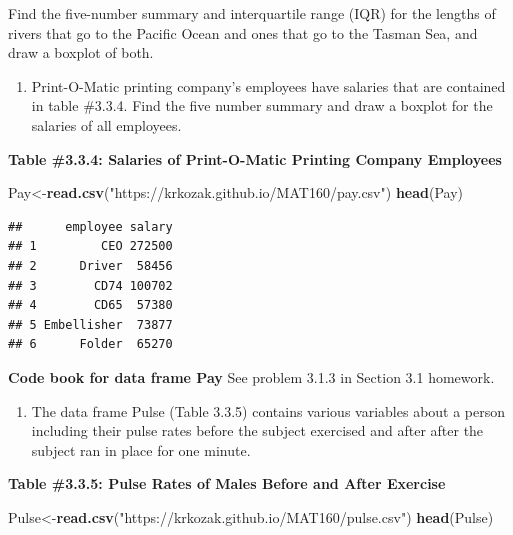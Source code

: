 \documentclass[]{book}
\newenvironment{Shaded}{\begin{snugshade}}{\end{snugshade}}
\newcommand{\KeywordTok}[1]{\textcolor[rgb]{0.13,0.29,0.53}{\textbf{#1}}}
\newcommand{\NormalTok}[1]{#1}
\newcommand{\StringTok}[1]{\textcolor[rgb]{0.31,0.60,0.02}{#1}}
\providecommand{\tightlist}{%
  \setlength{\itemsep}{0pt}\setlength{\parskip}{0pt}}
\begin{document}
Find the five-number summary and interquartile range (IQR) for the lengths of rivers that go to the Pacific Ocean and ones that go to the Tasman Sea, and draw a boxplot of both.

\begin{enumerate}
\def\labelenumi{\arabic{enumi}.}
\setcounter{enumi}{6}
\tightlist
\item
  Print-O-Matic printing company's employees have salaries that are contained in table \#3.3.4. Find the five number summary and draw a boxplot for the salaries of all employees.
\end{enumerate}

\textbf{Table \#3.3.4: Salaries of Print-O-Matic Printing Company Employees}

\begin{Shaded}
\begin{Highlighting}[]
\NormalTok{Pay<-}\KeywordTok{read.csv}\NormalTok{(}\StringTok{"https://krkozak.github.io/MAT160/pay.csv"}\NormalTok{)}
\KeywordTok{head}\NormalTok{(Pay)}
\end{Highlighting}
\end{Shaded}

\begin{verbatim}
##      employee salary
## 1         CEO 272500
## 2      Driver  58456
## 3        CD74 100702
## 4        CD65  57380
## 5 Embellisher  73877
## 6      Folder  65270
\end{verbatim}

\textbf{Code book for data frame Pay} See problem 3.1.3 in Section 3.1 homework.

\begin{enumerate}
\def\labelenumi{\arabic{enumi}.}
\setcounter{enumi}{7}
\tightlist
\item
  The data frame Pulse (Table 3.3.5) contains various variables about a person including their pulse rates before the subject exercised and after after the subject ran in place for one minute.
\end{enumerate}

\textbf{Table \#3.3.5: Pulse Rates of Males Before and After Exercise}

\begin{Shaded}
\begin{Highlighting}[]
\NormalTok{Pulse<-}\KeywordTok{read.csv}\NormalTok{(}\StringTok{"https://krkozak.github.io/MAT160/pulse.csv"}\NormalTok{)}
\KeywordTok{head}\NormalTok{(Pulse)}
\end{Highlighting}
\end{Shaded}
\end{document}
